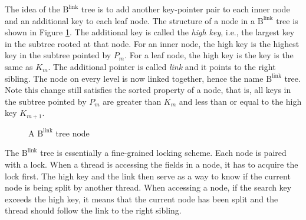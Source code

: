 \documentclass[11pt]{report}
\theoremstyle{definition}
\begin{document}
The idea of the $\text{B}^{\text{link}}$ tree is to add another key-pointer pair to each inner node and an additional key to each leaf node. The structure of a node in a $\text{B}^{\text{link}}$ tree is shown in Figure \ref{fig:blink_node}. The additional key is called the \textit{high key}, i.e., the largest key in the subtree rooted at that node. For an inner node, the high key is the highest key in the subtree pointed by $P_m$. For a leaf node, the high key is the key is the same as $K_m$. The additional pointer is called \textit{link} and it points to the right sibling. The node on every level is now linked together, hence the name $\text{B}^{\text{link}}$ tree. Note this change still satisfies the sorted property of a node, that is, all keys in the subtree pointed by $P_m$ are greater than $K_m$ and less than or equal to the high key $K_{m+1}$.

\begin{figure}[h]
  \centering
  \vspace{0.5em}
  \caption{A $\text{B}^{\text{link}}$ tree node}
  \label{fig:blink_node}
\end{figure}

The $\text{B}^{\text{link}}$ tree is essentially a fine-grained locking scheme. Each node is paired with a lock. When a thread is accessing the fields in a node, it has to acquire the lock first. The high key and the link then serve as a way to know if the current node is being split by another thread. When accessing a node, if the search key  exceeds the high key, it means that the current node has been split and the thread should follow the link to the right sibling.
\end{document}
